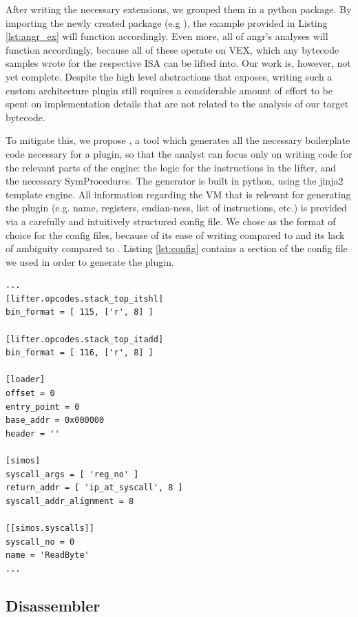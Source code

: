 After writing the necessary extensions, we grouped them in a python package. By importing the newly created package (e.g ), the example provided in Listing \ref{lst:angr_ex} will function accordingly. Even more, all of angr's analyses will function accordingly, because all of these operate on VEX, which any bytecode samples wrote for the respective \gls{ISA} can be lifted into. Our work is, however, not yet complete. Despite the high level abstractions that  exposes, writing such a custom architecture plugin still requires a considerable amount of effort to be spent on implementation details that are not related to the analysis of our target bytecode.

To mitigate this, we propose , a tool which generates all the necessary boilerplate code necessary for a plugin, so that the analyst can focus only on writing code for the relevant parts of the engine: the logic for the instructions in the lifter, and the necessary SymProcedures. The generator is built in python, using the jinja2 \cite{jinja} template engine. All information regarding the \gls{VM} that is relevant for generating the plugin (e.g. name, registers, endian-ness, list of instructions, etc.) is provided via a carefully and intuitively structured config file. We chose  \cite{toml} as the format of choice for the config files, because of its ease of writing compared to  and its lack of ambiguity compared to . Listing \ref{lst:config} contains a section of the config file we used in order to generate the  plugin.

\begin{lstlisting}[label={lst:config}, caption={Section of the a config file used as input for the \cc{arch-genesis} tool. The section contains a partial list of instructions (opcodes), loader details, as well as information essential for the syscall calling convention.}]
...
[lifter.opcodes.stack_top_itshl]
bin_format = [ 115, ['r', 8] ]

[lifter.opcodes.stack_top_itadd]
bin_format = [ 116, ['r', 8] ]

[loader]
offset = 0
entry_point = 0
base_addr = 0x000000
header = ''

[simos]
syscall_args = [ 'reg_no' ]
return_addr = [ 'ip_at_syscall', 8 ]
syscall_addr_alignment = 8

[[simos.syscalls]]
syscall_no = 0
name = 'ReadByte'
...
\end{lstlisting}

\subsection{Disassembler}

